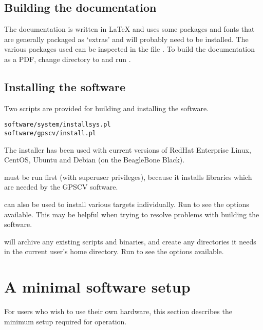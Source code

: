 \subsection{Building the documentation}

The documentation is written in LaTeX and uses some packages and fonts that are generally packaged as `extras'
and will probably need to be installed. The various packages used can be inspected in the file
.
To build the documentation as a PDF, change directory to  and run .

\subsection{Installing the software}

Two scripts are provided for building and installing the software.
\begin{lstlisting}
software/system/installsys.pl
software/gpscv/install.pl
\end{lstlisting}

The installer has been used with current versions of RedHat Enterprise Linux, 
CentOS, Ubuntu and Debian (on the BeagleBone Black).

 must be run first (with superuser privileges), 
because it installs libraries which are needed by the GPSCV software.

 can also be used to install various targets individually.
Run  to see the options available. 
This may be helpful when trying to resolve problems with building the software.

 will archive any existing scripts and binaries, and create any
directories it needs in the current user's home directory. 
Run  to see the options available.

\section{A minimal software setup}

For users who wish to use their own hardware,
this section describes the minimum setup required for operation.

